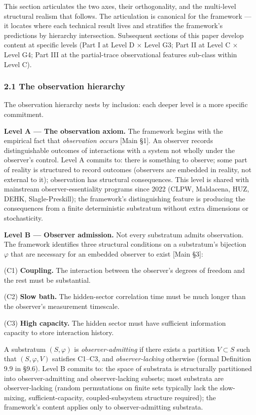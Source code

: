 \documentclass[
]{article}
\begin{document}
This section articulates the two axes, their orthogonality, and the
multi-level structural realism that follows. The articulation is
canonical for the framework --- it locates where each technical result
lives and stratifies the framework's predictions by hierarchy
intersection. Subsequent sections of this paper develop content at
specific levels (Part I at Level D × Level G3; Part II at Level C ×
Level G4; Part III at the partial-trace observational features sub-class
within Level C).

\hypertarget{the-observation-hierarchy}{%
\subsubsection{2.1 The observation
hierarchy}\label{the-observation-hierarchy}}

The observation hierarchy nests by inclusion: each deeper level is a
more specific commitment.

\textbf{Level A --- The observation axiom.} The framework begins with
the empirical fact that \emph{observation occurs} {[}Main §1{]}. An
observer records distinguishable outcomes of interactions with a system
not wholly under the observer's control. Level A commits to: there is
something to observe; some part of reality is structured to record
outcomes (observers are embedded in reality, not external to it);
observation has structural consequences. This level is shared with
mainstream observer-essentiality programs since 2022 (CLPW, Maldacena,
HUZ, DEHK, Slagle-Preskill); the framework's distinguishing feature is
producing the consequences from a finite deterministic substratum
without extra dimensions or stochasticity.

\textbf{Level B --- Observer admission.} Not every substratum admits
observation. The framework identifies three structural conditions on a
substratum's bijection \(\varphi\) that are necessary for an embedded
observer to exist {[}Main §3{]}:

(C1) \textbf{Coupling.} The interaction between the observer's degrees
of freedom and the rest must be substantial.

(C2) \textbf{Slow bath.} The hidden-sector correlation time must be much
longer than the observer's measurement timescale.

(C3) \textbf{High capacity.} The hidden sector must have sufficient
information capacity to store interaction history.

A substratum \((S, \varphi)\) is \emph{observer-admitting} if there
exists a partition \(V \subset S\) such that \((S, \varphi, V)\)
satisfies C1--C3, and \emph{observer-lacking} otherwise (formal
Definition 9.9 in §9.6). Level B commits to: the space of substrata is
structurally partitioned into observer-admitting and observer-lacking
subsets; most substrata are observer-lacking (random permutations on
finite sets typically lack the slow-mixing, sufficient-capacity,
coupled-subsystem structure required); the framework's content applies
only to observer-admitting substrata.
\end{document}

